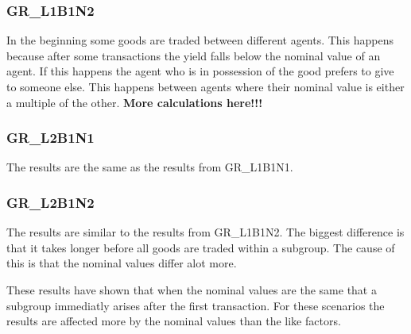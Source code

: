 \documentclass[twoside,openright]{uva-bachelor-thesis}
\begin{document}
\subsubsection{GR\_L1B1N2}
In the beginning some goods are traded between different agents. This happens because after some transactions the yield falls below the nominal value of an agent. If this happens the agent who is in possession of the good prefers to give to someone else. This happens between agents where their nominal value is either a multiple of the other. \textbf{More calculations here!!!} 
\subsubsection{GR\_L2B1N1}
The results are the same as the results from GR\_L1B1N1.
\subsubsection{GR\_L2B1N2}
The results are similar to the results from GR\_L1B1N2. The biggest difference is that it takes longer before all goods are traded within a subgroup. The cause of this is that the nominal values differ alot more.

These results have shown that when the nominal values are the same that a subgroup immediatly arises after the first transaction. For these scenarios the results are affected more by the nominal values than the like factors. 
\end{document}
